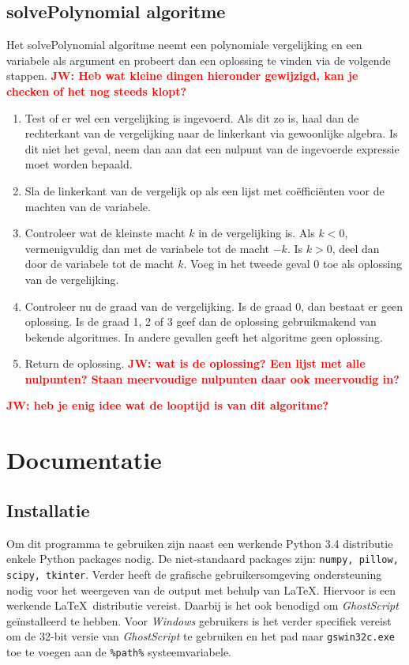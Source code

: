 \documentclass[a4paper]{article}
\newcommand{\rcom}[1]{\textbf{\textcolor{red}{#1}}}
\begin{document}
\subsection{solvePolynomial algoritme}
Het solvePolynomial algoritme neemt een polynomiale vergelijking en een variabele als argument en probeert dan een oplossing te vinden via de volgende stappen. \rcom{JW: Heb wat kleine dingen hieronder gewijzigd, kan je checken of het nog steeds klopt?}
\begin{enumerate}
\item Test of er wel een vergelijking is ingevoerd. Als dit zo is, haal dan de rechterkant van de vergelijking naar de linkerkant via gewoonlijke algebra. Is dit niet het geval, neem dan aan dat een nulpunt van de ingevoerde expressie moet worden bepaald.
\item Sla de linkerkant van de vergelijk op als een lijst met co\"effici\"enten voor de machten van de variabele. 
\item Controleer wat de kleinste macht $k$ in de vergelijking is. Als $k<0$, vermenigvuldig dan met de variabele tot de macht $-k$. Is $k>0$, deel dan door de variabele tot de macht $k$. Voeg in het tweede geval 0 toe als oplossing van de vergelijking.
\item Controleer nu de graad van de vergelijking. Is de graad 0, dan bestaat er geen oplossing. Is de graad 1, 2 of 3 geef dan de oplossing gebruikmakend van bekende algoritmes. In andere gevallen geeft het algoritme geen oplossing.
\item Return de oplossing. \rcom{JW: wat is de oplossing? Een lijst met alle nulpunten? Staan meervoudige nulpunten daar ook meervoudig in?}
\end{enumerate}

\rcom{JW: heb je enig idee wat de looptijd is van dit algoritme?}

\section{Documentatie}
\subsection{Installatie}
Om dit programma te gebruiken zijn naast een werkende Python 3.4 distributie enkele Python packages nodig. De niet-standaard packages zijn: \texttt{numpy, pillow, scipy, tkinter}.
Verder heeft de grafische gebruikersomgeving ondersteuning nodig voor het weergeven van de output met behulp van \LaTeX. Hiervoor is een werkende \LaTeX~distributie vereist. Daarbij is het ook benodigd om \emph{GhostScript} ge\"installeerd te hebben. Voor \emph{Windows} gebruikers is het verder specifiek vereist om de 32-bit versie van \emph{GhostScript} te gebruiken en het pad naar \texttt{gswin32c.exe} toe te voegen aan de \texttt{\%path\%} systeemvariabele.
\end{document}
